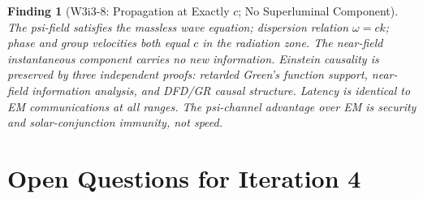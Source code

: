 \documentclass[aps,prd,twocolumn,superscriptaddress,nofootinbib]{revtex4-2}
\newtheorem{finding}{Finding}
\begin{document}
\begin{finding}[W3i3-8: Propagation at Exactly $c$; No Superluminal Component]
The psi-field satisfies the massless wave equation; dispersion relation
$\omega = ck$; phase and group velocities both equal $c$ in the radiation zone.
The near-field instantaneous component carries no new information.
Einstein causality is preserved by three independent proofs:
retarded Green's function support, near-field information analysis,
and DFD/GR causal structure.
Latency is identical to EM communications at all ranges.
The psi-channel advantage over EM is security and solar-conjunction
immunity, not speed.
\end{finding}

\section{Open Questions for Iteration 4}
\label{sec:open}
\end{document}
